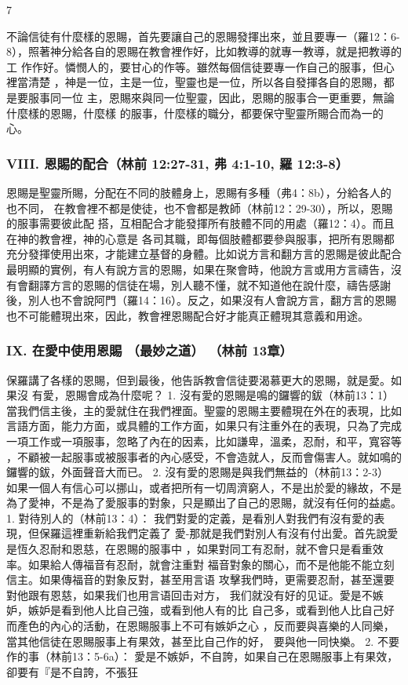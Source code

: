 7

不論信徒有什麼樣的恩賜，首先要讓自己的恩賜發揮出來，並且要專一（羅12：6-
8），照著神分給各自的恩賜在教會裡作好，比如教導的就專一教導，就是把教導的工
作作好。憐憫人的，要甘心的作等。雖然每個信徒要專一作自己的服事，但心裡當清楚
，神是一位，主是一位，聖靈也是一位，所以各自發揮各自的恩賜，都是要服事同一位
主，恩賜來與同一位聖靈，因此，恩賜的服事合一更重要，無論什麼樣的恩賜，什麼樣
的服事，什麼樣的職分，都要保守聖靈所賜合而為一的心。

\subsubsection{VIII. 恩賜的配合（林前 12:27-31, 弗 4:1-10, 羅 12:3-8）}
恩賜是聖靈所賜，分配在不同的肢體身上，恩賜有多種（弗4：8b），分給各人的也不同，
在教會裡不都是使徒，也不會都是教師（林前12：29-30），所以，恩賜的服事需要彼此配
搭，互相配合才能發揮所有肢體不同的用處（羅12：4）。而且在神的教會裡，神的心意是
各司其職，即每個肢體都要參與服事，把所有恩賜都充分發揮使用出來，才能建立基督的身體。比如说方言和翻方言的恩賜是彼此配合最明顯的實例，有人有說方言的恩賜，如果在聚會時，他說方言或用方言禱告，沒有會翻譯方言的恩賜的信徒在場，別人聽不懂，就不知道他在說什麼，禱告感謝後，別人也不會說阿門（羅14：16）。反之，如果沒有人會說方言，翻方言的恩賜也不可能體現出來，因此，教會裡恩賜配合好才能真正體現其意義和用途。

\subsubsection{IX. 在愛中使用恩賜 （最妙之道） （林前 13章）}

保羅講了各樣的恩賜，但到最後，他告訴教會信徒要渴慕更大的恩賜，就是愛。如果沒
有愛，恩賜會成為什麼呢？
1. 沒有愛的恩賜是鳴的鑼響的鈸（林前13：1）
當我們信主後，主的愛就住在我們裡面。聖靈的恩賜主要體現在外在的表現，比如
言語方面，能力方面，或具體的工作方面，如果只有注重外在的表現，只為了完成
一項工作或一項服事，忽略了內在的因素，比如謙卑，溫柔，忍耐，和平，寬容等
，不顧被一起服事或被服事者的內心感受，不會造就人，反而會傷害人。就如鳴的
鑼響的鈸，外面聲音大而已。
2. 沒有愛的恩賜是與我們無益的（林前13：2-3）
如果一個人有信心可以挪山，或者把所有一切周濟窮人，不是出於愛的緣故，不是
為了愛神，不是為了愛服事的對象，只是顯出了自己的恩賜，就沒有任何的益處。
1. 對待別人的（林前13：4）：
我們對愛的定義，是看別人對我們有沒有愛的表現，但保羅這裡重新給我們定義了
愛-那就是我們對別人有沒有付出愛。首先說愛是恆久忍耐和恩慈，在恩賜的服事中
，如果對同工有忍耐，就不會只是看重效率。如果給人傳福音有忍耐，就會注重對
福音對象的關心，而不是他能不能立刻信主。如果傳福音的對象反對，甚至用言语
攻擊我們時，更需要忍耐，甚至還要對他跟有恩慈，如果我们也用言语回击对方，
我们就没有好的见证。愛是不嫉妒，嫉妒是看到他人比自己強，或看到他人有的比
自己多，或看到他人比自己好而產色的內心的活動，在恩賜服事上不可有嫉妒之心
，反而要與喜樂的人同樂，當其他信徒在恩賜服事上有果效，甚至比自己作的好，
要與他一同快樂。
2. 不要作的事（林前13：5-6a）：
愛是不嫉妒，不自誇，如果自己在恩賜服事上有果效，卻要有『是不自誇，不張狂

